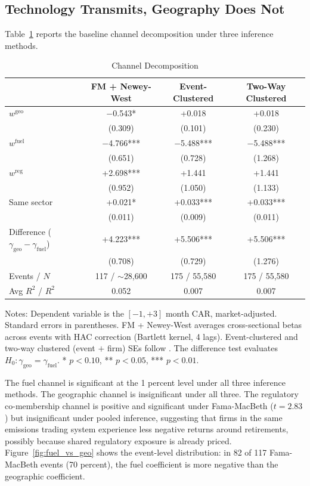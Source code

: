 \documentclass[12pt,a4paper]{article}
\begin{document}
\subsection{Technology Transmits, Geography Does Not}\label{sec:fuel_results}

Table~\ref{tab:channel_decomp} reports the baseline channel decomposition under three inference methods.

\begin{table}[H]
\centering
\caption{Channel Decomposition}
\label{tab:channel_decomp}
\begin{tabular}{lccc}
\toprule
 & FM + Newey-West & Event-Clustered & Two-Way Clustered \\
\midrule
$w^{\text{geo}}$ & $-$0.543* & +0.018 & +0.018 \\
 & (0.309) & (0.101) & (0.230) \\[4pt]
$w^{\text{fuel}}$ & $-$4.766*** & $-$5.488*** & $-$5.488*** \\
 & (0.651) & (0.728) & (1.268) \\[4pt]
$w^{\text{reg}}$ & +2.698*** & +1.441 & +1.441 \\
 & (0.952) & (1.050) & (1.133) \\[4pt]
Same sector & +0.021* & +0.033*** & +0.033*** \\
 & (0.011) & (0.009) & (0.011) \\[4pt]
\midrule
Difference ($\gamma_{\text{geo}} - \gamma_{\text{fuel}}$) & +4.223*** & +5.506*** & +5.506*** \\
 & (0.708) & (0.729) & (1.276) \\
\midrule
Events / $N$ & 117 / $\sim$28,600 & 175 / 55,580 & 175 / 55,580 \\
Avg $R^2$ / $R^2$ & 0.052 & 0.007 & 0.007 \\
\bottomrule
\end{tabular}
\begin{flushleft}\footnotesize
Notes: Dependent variable is the $[-1, +3]$ month CAR, market-adjusted. Standard errors in parentheses. FM + Newey-West averages cross-sectional betas across events with HAC correction (Bartlett kernel, 4 lags). Event-clustered and two-way clustered (event $+$ firm) SEs follow \citet{CameronGelbachMiller2011}. The difference test evaluates $H_0\!: \gamma_{\text{geo}} = \gamma_{\text{fuel}}$. * $p<0.10$, ** $p<0.05$, *** $p<0.01$.
\end{flushleft}
\end{table}

The fuel channel is significant at the 1 percent level under all three inference methods. The geographic channel is insignificant under all three. The regulatory co-membership channel is positive and significant under Fama-MacBeth ($t = 2.83$) but insignificant under pooled inference, suggesting that firms in the same emissions trading system experience less negative returns around retirements, possibly because shared regulatory exposure is already priced. Figure~\ref{fig:fuel_vs_geo} shows the event-level distribution: in 82 of 117 Fama-MacBeth events (70 percent), the fuel coefficient is more negative than the geographic coefficient.
\end{document}
